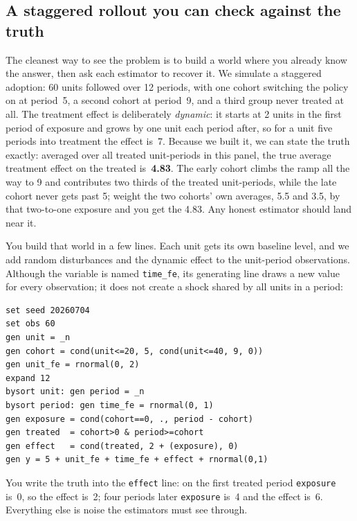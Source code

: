 \documentclass[
    a4paper,
    fontsize=10pt,
    twoside=true,
    numbers=noenddot,
]{kaobook}
\begin{document}
\subsection{A staggered rollout you can check against the truth}
The cleanest way to see the problem is to build a world where you already know the answer, then ask each estimator to recover it. We simulate a staggered adoption: 60 units followed over 12 periods, with one cohort switching the policy on at period~5, a second cohort at period~9, and a third group never treated at all. The treatment effect is deliberately \emph{dynamic}: it starts at 2 units in the first period of exposure and grows by one unit each period after, so for a unit five periods into treatment the effect is~7. Because we built it, we can state the truth exactly: averaged over all treated unit-periods in this panel, the true average treatment effect on the treated is~\textbf{4.83}. The early cohort climbs the ramp all the way to 9 and contributes two thirds of the treated unit-periods, while the late cohort never gets past 5; weight the two cohorts' own averages, 5.5 and 3.5, by that two-to-one exposure and you get the 4.83. Any honest estimator should land near it.

You build that world in a few lines. Each unit gets its own baseline level, and we add random disturbances and the dynamic effect to the unit-period observations. Although the variable is named \texttt{time\_fe}, its generating line draws a new value for every observation; it does not create a shock shared by all units in a period:
\par
{\footnotesize
\begin{verbatim}
set seed 20260704
set obs 60
gen unit = _n
gen cohort = cond(unit<=20, 5, cond(unit<=40, 9, 0))
gen unit_fe = rnormal(0, 2)
expand 12
bysort unit: gen period = _n
bysort period: gen time_fe = rnormal(0, 1)
gen exposure = cond(cohort==0, ., period - cohort)
gen treated  = cohort>0 & period>=cohort
gen effect   = cond(treated, 2 + (exposure), 0)
gen y = 5 + unit_fe + time_fe + effect + rnormal(0,1)
\end{verbatim}
}
You write the truth into the \texttt{effect} line: on the first treated period \texttt{exposure} is~0, so the effect is~2; four periods later \texttt{exposure} is~4 and the effect is~6. Everything else is noise the estimators must see through.
\end{document}
